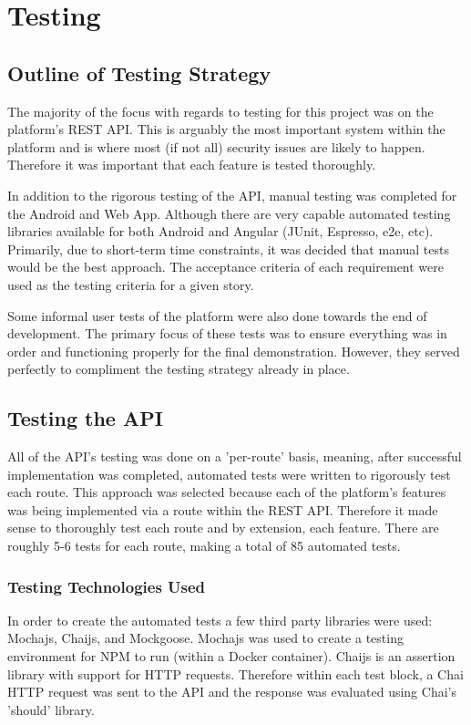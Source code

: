 \chapter{Testing}

\section{Outline of Testing Strategy}
The majority of the focus with regards to testing for this project was on the platform's REST API. This is arguably the most important system within the platform and is where most (if not all) security issues are likely to happen. Therefore it was important that each feature is tested thoroughly.

In addition to the rigorous testing of the API, manual testing was completed for the Android and Web App. Although there are very capable automated testing libraries available for both Android and Angular (JUnit, Espresso, e2e, etc). Primarily, due to short-term time constraints, it was decided that manual tests would be the best approach. The acceptance criteria of each requirement were used as the testing criteria for a given story. 

Some informal user tests of the platform were also done towards the end of development. The primary focus of these tests was to ensure everything was in order and functioning properly for the final demonstration. However, they served perfectly to compliment the testing strategy already in place. 

\section{Testing the API}
All of the API's testing was done on a 'per-route' basis, meaning, after successful implementation was completed, automated tests were written to rigorously test each route. This approach was selected because each of the platform's features was being implemented via a route within the REST API. Therefore it made sense to thoroughly test each route and by extension, each feature. There are roughly 5-6 tests for each route, making a total of 85 automated tests. 

\subsection{Testing Technologies Used}
In order to create the automated tests a few third party libraries were used: Mochajs, Chaijs, and Mockgoose. Mochajs was used to create a testing environment for NPM to run (within a Docker container). Chaijs is an assertion library with support for HTTP requests. Therefore within each test block, a Chai HTTP request was sent to the API and the response was evaluated using Chai's 'should' library.

